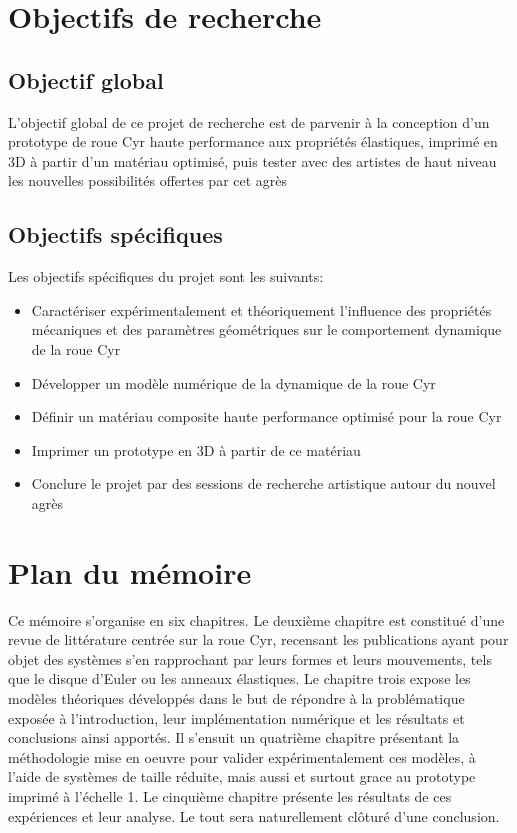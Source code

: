 \FloatBarrier


\section{Objectifs de recherche}  %
\subsection{Objectif global}
L'objectif global de ce projet de recherche est de parvenir à la conception d’un prototype de roue Cyr haute performance aux propriétés élastiques, imprimé en 3D à partir d’un matériau optimisé, puis tester avec des artistes de haut niveau les nouvelles possibilités offertes par cet agrès

\subsection{Objectifs spécifiques}
Les objectifs spécifiques du projet sont les suivants:
\begin{itemize}
    \item Caractériser expérimentalement et théoriquement l’influence des propriétés mécaniques et des paramètres géométriques sur le comportement dynamique de la roue Cyr
    \item Développer un modèle numérique de la dynamique de la roue Cyr
    \item Définir un matériau composite haute performance optimisé pour la roue Cyr
    \item Imprimer un prototype en 3D à partir de ce matériau
    \item Conclure le projet par des sessions de recherche artistique autour du nouvel agrès
\end{itemize}


\section{Plan du mémoire}  %
Ce mémoire s'organise en six chapitres. Le deuxième chapitre est constitué d'une revue de littérature centrée sur la roue Cyr, recensant les publications ayant pour objet des systèmes s'en rapprochant par leurs formes et leurs mouvements, tels que le disque d'Euler ou les anneaux élastiques. Le chapitre trois expose les modèles théoriques développés dans le but de répondre à la problématique exposée à l'introduction, leur implémentation numérique et les résultats et conclusions ainsi apportés. Il s'ensuit un quatrième chapitre présentant la méthodologie mise en oeuvre pour valider expérimentalement ces modèles, à l'aide de systèmes de taille réduite, mais aussi et surtout grace au prototype imprimé à l'échelle 1. Le cinquième chapitre présente les résultats de ces expériences et leur analyse. Le tout sera naturellement clôturé d'une conclusion.